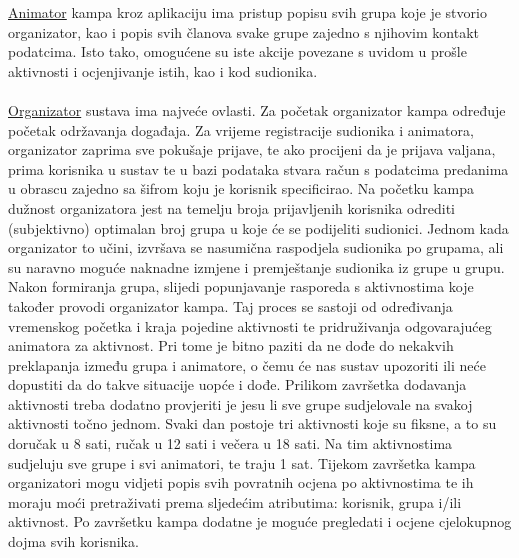     \underline{Animator} kampa kroz aplikaciju ima pristup popisu svih grupa koje je stvorio organizator, kao i popis svih članova svake grupe zajedno s njihovim kontakt podatcima. Isto tako, omogućene su iste akcije povezane s uvidom u prošle aktivnosti i ocjenjivanje istih, kao i kod sudionika.
    \\
    \\
    \underline{Organizator} sustava ima najveće ovlasti. Za početak organizator kampa određuje početak održavanja događaja. Za vrijeme registracije sudionika i animatora, organizator zaprima sve pokušaje prijave, te ako procijeni da je prijava valjana, prima korisnika u sustav te u bazi podataka stvara račun s podatcima predanima u obrascu zajedno sa šifrom koju je korisnik specificirao. Na početku kampa dužnost organizatora jest na temelju broja prijavljenih korisnika odrediti (subjektivno) optimalan broj grupa u koje će se podijeliti sudionici. Jednom kada organizator to učini, izvršava se nasumična raspodjela sudionika po grupama, ali su naravno moguće naknadne izmjene i premještanje sudionika iz grupe u grupu. Nakon formiranja grupa, slijedi popunjavanje rasporeda s aktivnostima koje također provodi organizator kampa. Taj proces se sastoji od određivanja vremenskog početka i kraja pojedine aktivnosti te pridruživanja odgovarajućeg animatora za aktivnost. Pri tome je bitno paziti da ne dođe do nekakvih preklapanja između grupa i animatore, o čemu će nas sustav upozoriti ili neće dopustiti da do takve situacije uopće i dođe. Prilikom završetka dodavanja aktivnosti treba dodatno provjeriti je jesu li sve grupe sudjelovale na svakoj aktivnosti točno jednom. Svaki dan postoje tri aktivnosti koje su fiksne, a to su doručak u 8 sati, ručak u 12 sati i večera u 18 sati. Na tim aktivnostima sudjeluju sve grupe i svi animatori, te traju 1 sat. Tijekom završetka kampa organizatori mogu vidjeti popis svih povratnih ocjena po aktivnostima te ih moraju moći pretraživati prema sljedećim atributima: korisnik, grupa i/ili aktivnost. Po završetku kampa dodatne je moguće pregledati i ocjene cjelokupnog dojma svih korisnika.

		
		\eject
		
	